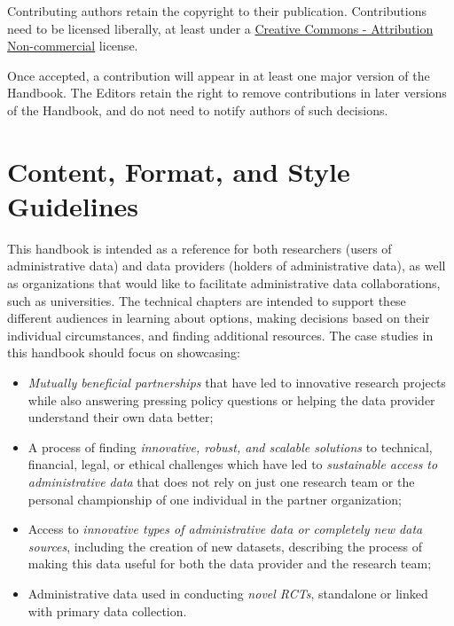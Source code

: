 \documentclass[
]{book}
\providecommand{\tightlist}{%
  \setlength{\itemsep}{0pt}\setlength{\parskip}{0pt}}
\begin{document}
Contributing authors retain the copyright to their publication. Contributions need to be licensed liberally, at least under a \href{https://creativecommons.org/licenses/by-nc/4.0/legalcode}{Creative Commons - Attribution Non-commercial} license.

Once accepted, a contribution will appear in at least one major version of the Handbook. The Editors retain the right to remove contributions in later versions of the Handbook, and do not need to notify authors of such decisions.

\hypertarget{content-format-and-style-guidelines}{%
\section*{Content, Format, and Style Guidelines}\label{content-format-and-style-guidelines}}

This handbook is intended as a reference for both researchers (users of administrative data) and data providers (holders of administrative data), as well as organizations that would like to facilitate administrative data collaborations, such as universities. The technical chapters are intended to support these different audiences in learning about options, making decisions based on their individual circumstances, and finding additional resources. The case studies in this handbook should focus on showcasing:

\begin{itemize}
\tightlist
\item
  \emph{Mutually beneficial partnerships} that have led to innovative research projects while also answering pressing policy questions or helping the data provider understand their own data better;
\item
  A process of finding \emph{innovative, robust, and scalable solutions} to technical, financial, legal, or ethical challenges which have led to \emph{sustainable access to administrative data} that does not rely on just one research team or the personal championship of one individual in the partner organization;
\item
  Access to \emph{innovative types of administrative data or completely new data sources}, including the creation of new datasets, describing the process of making this data useful for both the data provider and the research team;
\item
  Administrative data used in conducting \emph{novel RCTs}, standalone or linked with primary data collection.
\end{itemize}
\end{document}
